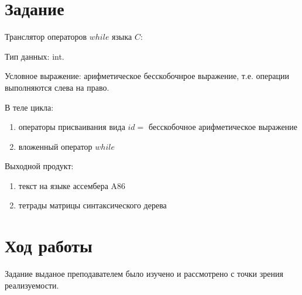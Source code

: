 





\section{Задание}
    Транслятор операторов $while$ языка $C$:
    
    Тип данных: int.
    
    Условное выражение: арифметическое бесскобочнрое выражение,
    т.е. операции выполняются слева на право.

    В теле цикла:
    \begin{enumerate}
        \item операторы присваивания вида $id=$ бесскобочное арифметическое выражение
        \item вложенный оператор $while$
    \end{enumerate}

    Выходной продукт:
    \begin{enumerate}
        \item текст на языке ассембера A86
        \item тетрады матрицы синтаксического дерева
    \end{enumerate}

\section{Ход работы}
    Задание выданое преподавателем было изучено и рассмотрено с точки зрения реализуемости.\\
    
